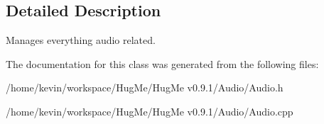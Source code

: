 \subsection{Detailed Description}
Manages everything audio related. 

The documentation for this class was generated from the following files:\begin{DoxyCompactItemize}
\item 
/home/kevin/workspace/HugMe/HugMe v0.9.1/Audio/Audio.h\item 
/home/kevin/workspace/HugMe/HugMe v0.9.1/Audio/Audio.cpp\end{DoxyCompactItemize}
